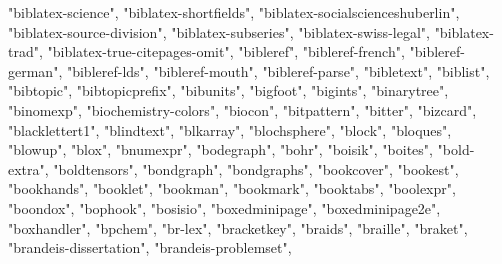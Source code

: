 \documentclass[
]{article}
\newenvironment{Shaded}{\begin{snugshade}}{\end{snugshade}}
\newcommand{\NormalTok}[1]{#1}
\newcommand{\StringTok}[1]{\textcolor[rgb]{0.31,0.60,0.02}{#1}}
\begin{document}
\begin{Shaded}
\begin{Highlighting}[]
\StringTok{"biblatex{-}science"}\NormalTok{, }\StringTok{"biblatex{-}shortfields"}\NormalTok{, }\StringTok{"biblatex{-}socialscienceshuberlin"}\NormalTok{, }
\StringTok{"biblatex{-}source{-}division"}\NormalTok{, }\StringTok{"biblatex{-}subseries"}\NormalTok{, }\StringTok{"biblatex{-}swiss{-}legal"}\NormalTok{, }
\StringTok{"biblatex{-}trad"}\NormalTok{, }\StringTok{"biblatex{-}true{-}citepages{-}omit"}\NormalTok{, }\StringTok{"bibleref"}\NormalTok{, }
\StringTok{"bibleref{-}french"}\NormalTok{, }\StringTok{"bibleref{-}german"}\NormalTok{, }\StringTok{"bibleref{-}lds"}\NormalTok{, }\StringTok{"bibleref{-}mouth"}\NormalTok{, }
\StringTok{"bibleref{-}parse"}\NormalTok{, }\StringTok{"bibletext"}\NormalTok{, }\StringTok{"biblist"}\NormalTok{, }\StringTok{"bibtopic"}\NormalTok{, }\StringTok{"bibtopicprefix"}\NormalTok{, }
\StringTok{"bibunits"}\NormalTok{, }\StringTok{"bigfoot"}\NormalTok{, }\StringTok{"bigints"}\NormalTok{, }\StringTok{"binarytree"}\NormalTok{, }\StringTok{"binomexp"}\NormalTok{, }\StringTok{"biochemistry{-}colors"}\NormalTok{, }
\StringTok{"biocon"}\NormalTok{, }\StringTok{"bitpattern"}\NormalTok{, }\StringTok{"bitter"}\NormalTok{, }\StringTok{"bizcard"}\NormalTok{, }\StringTok{"blacklettert1"}\NormalTok{, }
\StringTok{"blindtext"}\NormalTok{, }\StringTok{"blkarray"}\NormalTok{, }\StringTok{"blochsphere"}\NormalTok{, }\StringTok{"block"}\NormalTok{, }\StringTok{"bloques"}\NormalTok{, }\StringTok{"blowup"}\NormalTok{, }
\StringTok{"blox"}\NormalTok{, }\StringTok{"bnumexpr"}\NormalTok{, }\StringTok{"bodegraph"}\NormalTok{, }\StringTok{"bohr"}\NormalTok{, }\StringTok{"boisik"}\NormalTok{, }\StringTok{"boites"}\NormalTok{, }
\StringTok{"bold{-}extra"}\NormalTok{, }\StringTok{"boldtensors"}\NormalTok{, }\StringTok{"bondgraph"}\NormalTok{, }\StringTok{"bondgraphs"}\NormalTok{, }\StringTok{"bookcover"}\NormalTok{, }
\StringTok{"bookest"}\NormalTok{, }\StringTok{"bookhands"}\NormalTok{, }\StringTok{"booklet"}\NormalTok{, }\StringTok{"bookman"}\NormalTok{, }\StringTok{"bookmark"}\NormalTok{, }\StringTok{"booktabs"}\NormalTok{, }
\StringTok{"boolexpr"}\NormalTok{, }\StringTok{"boondox"}\NormalTok{, }\StringTok{"bophook"}\NormalTok{, }\StringTok{"bosisio"}\NormalTok{, }\StringTok{"boxedminipage"}\NormalTok{, }
\StringTok{"boxedminipage2e"}\NormalTok{, }\StringTok{"boxhandler"}\NormalTok{, }\StringTok{"bpchem"}\NormalTok{, }\StringTok{"br{-}lex"}\NormalTok{, }\StringTok{"bracketkey"}\NormalTok{, }
\StringTok{"braids"}\NormalTok{, }\StringTok{"braille"}\NormalTok{, }\StringTok{"braket"}\NormalTok{, }\StringTok{"brandeis{-}dissertation"}\NormalTok{, }\StringTok{"brandeis{-}problemset"}\NormalTok{, }

\end{Highlighting}
\end{Shaded}
\end{document}
